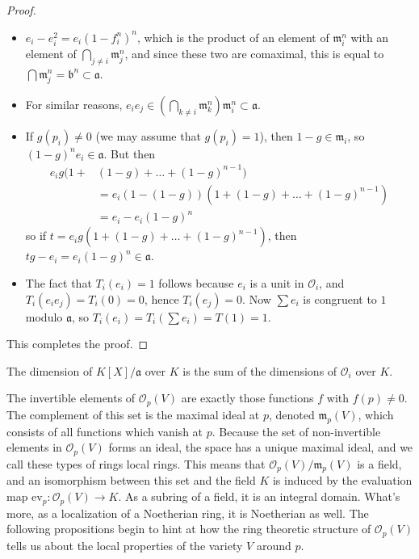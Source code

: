 \begin{proof}
\begin{itemize}
        \item $e_i - e_i^2 = e_i(1 - f_i^n)^n$, which is the product of an element of $\mathfrak{m}_i^n$ with an element of $\bigcap_{j \neq i} \mathfrak{m}_j^n$, and since these two are comaximal, this is equal to $\bigcap \mathfrak{m}_j^n = \mathfrak{b}^n \subset \mathfrak{a}$.

        \item For similar reasons, $e_ie_j \in (\bigcap_{k \neq i} \mathfrak{m}_k^n) \mathfrak{m}_i^n \subset \mathfrak{a}$.

        \item  If $g(p_i) \neq 0$ (we may assume that $g(p_i) = 1$), then $1 - g \in \mathfrak{m}_i$, so $(1-g)^n e_i \in \mathfrak{a}$. But then
    \begin{align*}
        e_i g(1 +& (1-g) + \dots + (1-g)^{n-1})\\
        &= e_i(1 - (1-g))(1 + (1-g) + \dots + (1-g)^{n-1})\\
        &= e_i - e_i (1 - g)^n
    \end{align*}
    so if $t = e_i g(1 + (1-g) + \dots + (1-g)^{n-1})$, then $tg - e_i = e_i(1-g)^n \in \mathfrak{a}$.

    \item The fact that $T_i(e_i) = 1$ follows because $e_i$ is a unit in $\mathcal{O}_i$, and $T_i(e_ie_j) = T_i(0) = 0$, hence $T_i(e_j) = 0$. Now $\sum e_i$ is congruent to $1$ modulo $\mathfrak{a}$, so $T_i(e_i) = T_i(\sum e_i) = T(1) = 1$.
    \end{itemize}
    This completes the proof.
\end{proof}

\begin{corollary}
    The dimension of $K[X]/\mathfrak{a}$ over $K$ is the sum of the dimensions of $\mathcal{O}_i$ over $K$.
\end{corollary}

The invertible elements of $\mathcal{O}_p(V)$ are exactly those functions $f$ with $f(p) \neq 0$. The complement of this set is the maximal ideal at $p$, denoted $\mathfrak{m}_p(V)$, which consists of all functions which vanish at $p$. Because the set of non-invertible elements in $\mathcal{O}_p(V)$ forms an ideal, the space has a unique maximal ideal, and we call these types of rings local rings. This means that $\mathcal{O}_p(V)/\mathfrak{m}_p(V)$ is a field, and an isomorphism between this set and the field $K$ is induced by the evaluation map $\text{ev}_p: \mathcal{O}_p(V) \to K$. As a subring of a field, it is an integral domain. What's more, as a localization of a Noetherian ring, it is Noetherian as well. The following propositions begin to hint at how the ring theoretic structure of $\mathcal{O}_p(V)$ tells us about the local properties of the variety $V$ around $p$.


